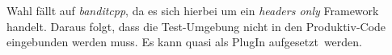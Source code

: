 







Wahl fällt auf \textit{banditcpp}, da es sich hierbei um ein \textit{headers only} Framework handelt.
Daraus folgt, dass die Test-Umgebung nicht in den Produktiv-Code eingebunden werden muss. Es kann quasi als PlugIn \glqq aufgesetzt\grqq\ werden.


